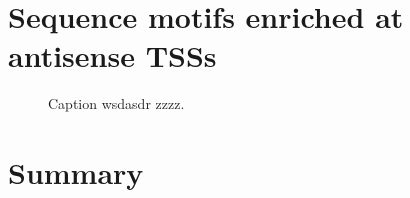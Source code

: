 \section{Sequence motifs enriched at antisense TSSs}

\begin{figure}
\caption[A figure showing motifs enriched upstream of Spt5-depletion-induced antisense TSSs.]{Caption wsdasdr zzzz.}
\end{figure}

\section{Summary}


\newpage

\begingroup
\singlespacing

\endgroup
